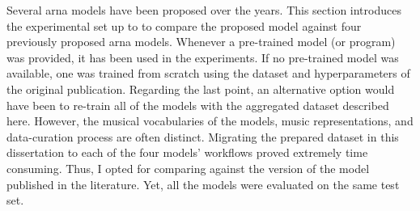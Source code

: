 
Several \gls{arna} models have been proposed over the years.
This section introduces the experimental set up to to
compare the proposed model against four previously proposed
\gls{arna} models. Whenever a pre-trained model (or program)
was provided, it has been used in the experiments. If no
pre-trained model was available, one was trained from
scratch using the dataset and hyperparameters of the
original publication. Regarding the last point, an
alternative option would have been to re-train all of the
models with the aggregated dataset described here. However,
the musical vocabularies of the models, music
representations, and data-curation process are often
distinct. Migrating the prepared dataset in this
dissertation to each of the four models' workflows proved
extremely time consuming. Thus, I opted for comparing
against the version of the model published in the
literature. Yet, all the models were evaluated on the same
test set.
